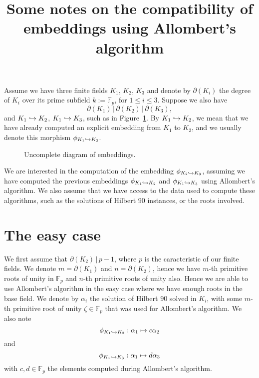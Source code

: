 \documentclass[a4paper,11pt]{article}
\title{Some notes on the compatibility of embeddings using Allombert's algorithm}
\author{}
\begin{document}
\maketitle





Assume we have three finite fields $K_1$, $K_2$, $K_3$ and denote by
$\partial(K_i)$ the degree of $K_i$ over its prime subfield
$k:=\mathbb{F}_p$, for $1\leq i\leq3$. Suppose we also have
\[\partial(K_1)\,|\,\partial(K_2)\,|\,\partial(K_3),\]
and $K_1\hookrightarrow K_2$, $K_1\hookrightarrow K_3$, \ie such as in
Figure~\ref{fig:uncomplete}. By $K_1\hookrightarrow K_2$, we mean that we have already
computed an explicit embedding from $K_1$ to $K_2$, and we usually denote this
morphism $\phi_{K_1\hookrightarrow K_2}$.
\begin{figure}
  \centering

  \caption{Uncomplete diagram of embeddings.}
  \label{fig:uncomplete}
\end{figure}
We are interested in the computation of the embedding $\phi_{K_2\hookrightarrow K_3}$,
assuming we have computed the previous embeddings $\phi_{K_1\hookrightarrow K_2}$ and
$\phi_{K_1\hookrightarrow K_3}$ using Allombert's algorithm. We also assume that we have access
to the data used to compute these algorithms, such as the solutions of Hilbert
$90$ instances, or the roots involved.

\section{The easy case}
\label{sec:easy}

We first assume that $\partial(K_2)\,|\,p-1$, where $p$ is the caracteristic of
our finite fields. We denote $m=\partial(K_1)$ and $n=\partial(K_2)$, hence we
have $m$-th primitive roots of unity in $\mathbb{F}_p$ and $n$-th primitive
roots of unity also. Hence we are able to use Allombert's algorithm in the easy
case where we have enough roots in the base field. We denote by $\alpha_i$ the
solution of Hilbert $90$ solved in $K_i$, with some $m$-th primitive root of
unity $\zeta\in\mathbb{F}_p$ that was used for Allombert's algorithm. We also
note 
\[\phi_{K_1\hookrightarrow K_2}:\alpha_1\mapsto c\alpha_2
\]
and
\[\phi_{K_1\hookrightarrow K_3}:\alpha_1\mapsto d\alpha_3
\]
with $c, d\in\mathbb{F}_p$ the
elements computed during Allombert's algorithm.
\end{document}
